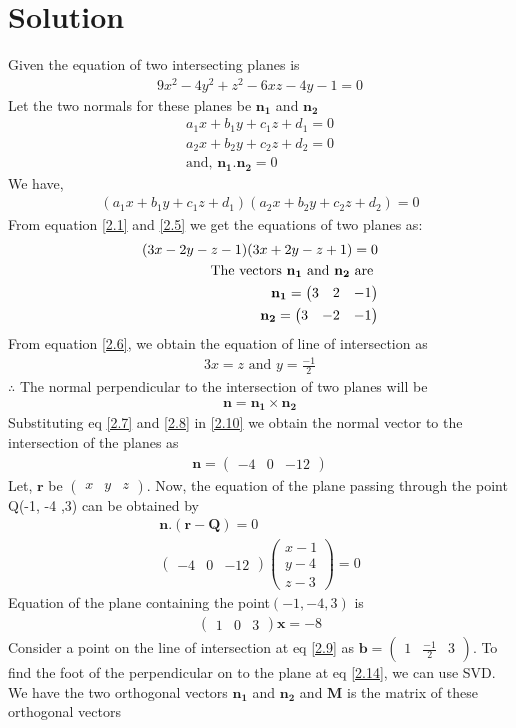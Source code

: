 \documentclass[journal,12pt,twocolumn]{IEEEtran}
\let\vec\mathbf
\numberwithin{equation}{subsection}
\newcommand{\myvec}[1]{\ensuremath{\begin{pmatrix}#1\end{pmatrix}}}
\begin{document}
\section{Solution}
Given the equation of two intersecting planes is 
\begin{align}
   9x^2 -4y^2 +z^2 -6xz -4y -1 =0\label{2.1}
\end{align}
Let the two normals for these planes be $\vec{n_1}$ and $\vec{n_2}$
\begin{align}
   a_{1}x+ b_{1}y +c_{1}z +d_{1} =0\label{2.2}\\
  a_{2}x +b_{2}y +c_{2}z +d_{2} =0\label{2.3}\\
\text{and, }
\vec{n_1}.\vec{n_2} = 0 \label{2.4}
\end{align}
We have,
\begin{align}
   (  a_{1}x+ b_{1}y +c_{1}z +d_{1})( a_{2}x +b_{2}y +c_{2}z +d_{2} ) = 0 \label{2.5}
\end{align}
From equation \ref{2.1} and \ref{2.5} we get the equations of two planes as:
\begin{align}
   ( 3x- 2y -z -1)( 3x +2y-z +1 ) = 0 \label{2.6}\\
\text{The vectors } \vec{n_{1}} \text{ and  }\vec{n_{2}} \text{ are }\notag \\ 
\vec{n_{1}} =\myvec{3 & 2& -1} \label{2.7}\\
\vec{n_{2}} =\myvec{3 & -2& -1} \label{2.8}
\end{align}
From equation \ref{2.6}, we obtain the equation of line of intersection as
\begin{align}
   3x = z \text{ and } y =\frac{-1}{2}\label{2.9}
\end{align}
$\therefore$ The normal perpendicular to the intersection of two planes will be
\begin{align}
   \vec{n} = \vec{n_{1}} \times \vec{n_{2}} \label{2.10}
\end{align}
Substituting eq \ref{2.7} and \ref{2.8} in \ref{2.10} we obtain the normal vector to the intersection of the planes as
\begin{align}
    \vec{n} = \myvec{-4 & 0 & -12} \label{2.11}
\end{align}
Let, $\vec{r}$ be \myvec{x& y& z}. Now, the equation of the plane passing through the point Q(-1, -4 ,3) can be obtained by
\begin{align}
    \vec{n} . ( \vec{r} - \vec{Q}) = 0  \label{2.12}\\
    \myvec{-4 & 0 & -12} \myvec{x-1 \\ y-4 \\ z-3} = 0
\end{align}
Equation of the plane containing the point$(-1, -4 , 3)$ is 
\begin{align}
    \myvec{1 & 0 & 3} \vec{x} = -8 \label{2.14}
\end{align}
Consider a point on the line of intersection at eq \ref{2.9} as $\vec{b} = \myvec{1 & \frac{-1}{2} & 3}$. To find the foot of the perpendicular on to the plane at eq \ref{2.14}, we can use SVD.
We have the two orthogonal vectors $\vec{n_{1}}$ and  $\vec{n_{2}}$ and $\vec{M}$ is the matrix of these orthogonal vectors
\end{document}
